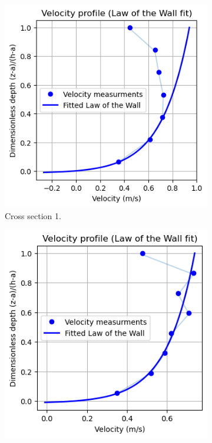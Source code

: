 \begin{figure}[H]
    \centering
    \begin{subfigure}[b]{0.31\linewidth}
        \includegraphics[width=\linewidth]{figures/ch6/cs1_vel_profile.png}
        \caption{Cross section 1.}
    \end{subfigure}
    \hfill
    \begin{subfigure}[b]{0.31\linewidth}
        \includegraphics[width=\linewidth]{figures/ch6/cs2_vel_profile.png}

\end{subfigure}
\end{figure}
